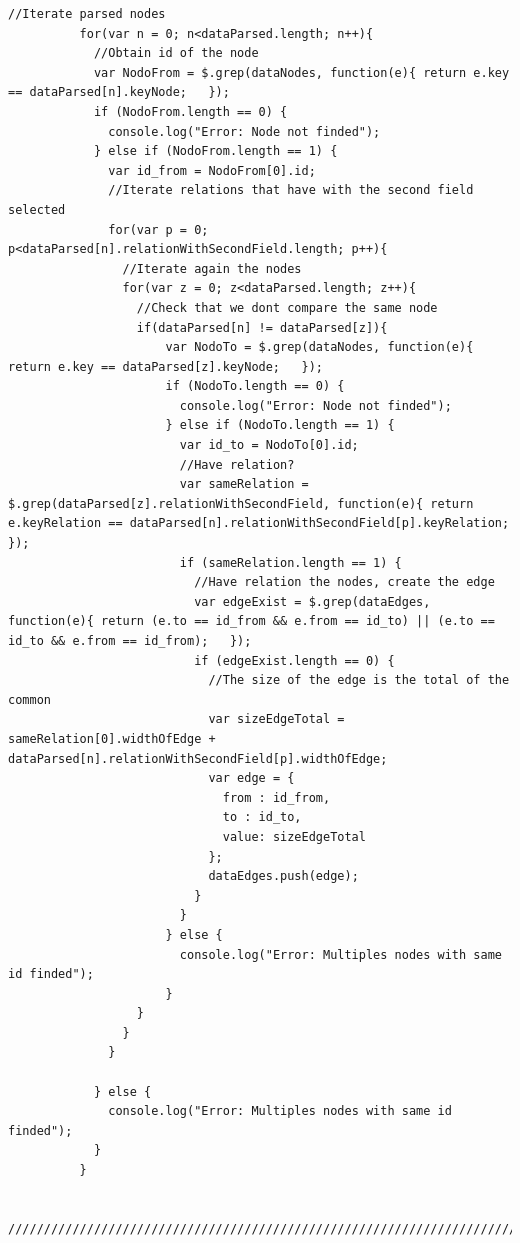 \documentclass[a4paper, 12pt]{book}
\begin{document}
\begin{lstlisting}[frame=single]
          //Iterate parsed nodes
          for(var n = 0; n<dataParsed.length; n++){
            //Obtain id of the node
            var NodoFrom = $.grep(dataNodes, function(e){ return e.key == dataParsed[n].keyNode;   });
            if (NodoFrom.length == 0) {
              console.log("Error: Node not finded");
            } else if (NodoFrom.length == 1) {
              var id_from = NodoFrom[0].id;
              //Iterate relations that have with the second field selected
              for(var p = 0; p<dataParsed[n].relationWithSecondField.length; p++){
                //Iterate again the nodes
                for(var z = 0; z<dataParsed.length; z++){
                  //Check that we dont compare the same node
                  if(dataParsed[n] != dataParsed[z]){
                      var NodoTo = $.grep(dataNodes, function(e){ return e.key == dataParsed[z].keyNode;   });
                      if (NodoTo.length == 0) {
                        console.log("Error: Node not finded");
                      } else if (NodoTo.length == 1) {
                        var id_to = NodoTo[0].id;
                        //Have relation?
                        var sameRelation = $.grep(dataParsed[z].relationWithSecondField, function(e){ return e.keyRelation == dataParsed[n].relationWithSecondField[p].keyRelation;   });
                        if (sameRelation.length == 1) {
                          //Have relation the nodes, create the edge
                          var edgeExist = $.grep(dataEdges, function(e){ return (e.to == id_from && e.from == id_to) || (e.to == id_to && e.from == id_from);   });
                          if (edgeExist.length == 0) {
                            //The size of the edge is the total of the common
                            var sizeEdgeTotal = sameRelation[0].widthOfEdge + dataParsed[n].relationWithSecondField[p].widthOfEdge;
                            var edge = {
                              from : id_from,
                              to : id_to,
                              value: sizeEdgeTotal
                            };
                            dataEdges.push(edge);
                          }
                        }
                      } else {
                        console.log("Error: Multiples nodes with same id finded");
                      }
                  }
                }
              }

            } else {
              console.log("Error: Multiples nodes with same id finded");
            }
          }

          //////////////////////////////////////////////////////////////////////////////////////////////////////////////


\end{lstlisting}
\end{document}
